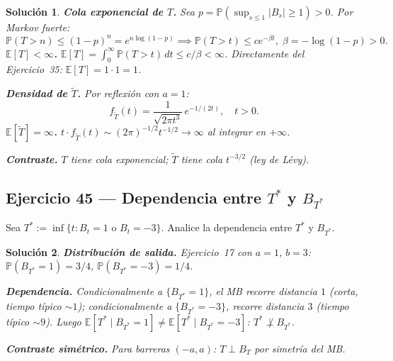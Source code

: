 \documentclass[12pt,letterpaper]{article}
\theoremstyle{ejercicio}
\theoremstyle{solucion}
\newtheorem*{solucion}{Solución}
\newcommand{\E}{\mathbb{E}}
\renewcommand{\P}{\mathbb{P}}
\begin{document}
\begin{solucion}
\textbf{Cola exponencial de $T$.} Sea $p=\P(\sup_{s\le 1}|B_s|\ge 1)>0$. Por Markov fuerte:
\[
  \P(T>n)\le(1-p)^n=e^{n\log(1-p)}\implies\P(T>t)\le ce^{-\beta t},\;\beta=-\log(1-p)>0.
\]
\textbf{$\E[T]<\infty$.} $\E[T]=\int_0^\infty\P(T>t)\,dt\le c/\beta<\infty$.
Directamente del Ejercicio~35: $\E[T]=1\cdot 1=1$.

\textbf{Densidad de $\tilde T$.} Por reflexión con $a=1$:
\[
  f_{\tilde T}(t)=\frac{1}{\sqrt{2\pi t^3}}\,e^{-1/(2t)},\quad t>0.
\]
\textbf{$\E[\tilde T]=\infty$.} $t\cdot f_{\tilde T}(t)\sim(2\pi)^{-1/2}t^{-1/2}\to\infty$
al integrar en $+\infty$.

\textbf{Contraste.} $T$ tiene cola exponencial; $\tilde T$ tiene cola $t^{-3/2}$ (ley de Lévy).
\end{solucion}

\subsection*{Ejercicio 45 — Dependencia entre $T^*$ y $B_{T^*}$}

\begin{recuadro}
Sea $T^*:=\inf\{t:B_t=1\text{ o }B_t=-3\}$. Analice la dependencia entre $T^*$ y $B_{T^*}$.
\end{recuadro}

\begin{solucion}
\textbf{Distribución de salida.} Ejercicio~17 con $a=1$, $b=3$:
$\P(B_{T^*}=1)=3/4$, $\P(B_{T^*}=-3)=1/4$.

\textbf{Dependencia.} Condicionalmente a $\{B_{T^*}=1\}$, el MB recorre distancia $1$ (corta,
tiempo típico $\sim 1$); condicionalmente a $\{B_{T^*}=-3\}$, recorre distancia $3$
(tiempo típico $\sim 9$). Luego
$\E[T^*\mid B_{T^*}=1]\ne\E[T^*\mid B_{T^*}=-3]$: $T^*\not\perp B_{T^*}$.

\textbf{Contraste simétrico.} Para barreras $(-a,a)$: $T\perp B_T$ por simetría del MB.
\end{solucion}
\end{document}
